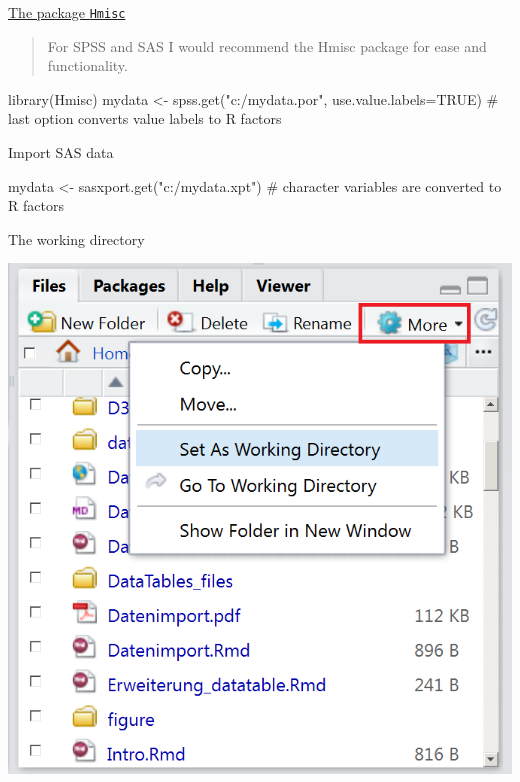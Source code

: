 \documentclass[
  10pt,
  ignorenonframetext,
]{beamer}
\newenvironment{Shaded}{\begin{snugshade}}{\end{snugshade}}
\newcommand{\CommentTok}[1]{\textcolor[rgb]{0.50,0.62,0.50}{#1}}
\newcommand{\DataTypeTok}[1]{\textcolor[rgb]{0.87,0.87,0.75}{#1}}
\newcommand{\KeywordTok}[1]{\textcolor[rgb]{0.94,0.87,0.69}{#1}}
\newcommand{\NormalTok}[1]{\textcolor[rgb]{0.80,0.80,0.80}{#1}}
\newcommand{\OtherTok}[1]{\textcolor[rgb]{0.94,0.94,0.56}{#1}}
\newcommand{\StringTok}[1]{\textcolor[rgb]{0.80,0.58,0.58}{#1}}
\begin{document}
\begin{frame}[fragile]{\href{https://www.statmethods.net/input/importingdata.html}{The
package \texttt{Hmisc}}}
\protect\hypertarget{the-package-hmisc}{}

\begin{quote}
For SPSS and SAS I would recommend the Hmisc package for ease and
functionality.
\end{quote}

\begin{Shaded}
\begin{Highlighting}[]
\KeywordTok{library}\NormalTok{(Hmisc)}
\NormalTok{mydata <-}\StringTok{ }\KeywordTok{spss.get}\NormalTok{(}\StringTok{"c:/mydata.por"}\NormalTok{, }\DataTypeTok{use.value.labels=}\OtherTok{TRUE}\NormalTok{)}
\CommentTok{# last option converts value labels to R factors}
\end{Highlighting}
\end{Shaded}

\begin{block}{Import SAS data}

\begin{Shaded}
\begin{Highlighting}[]
\NormalTok{mydata <-}\StringTok{ }\KeywordTok{sasxport.get}\NormalTok{(}\StringTok{"c:/mydata.xpt"}\NormalTok{)}
\CommentTok{# character variables are converted to R factors}
\end{Highlighting}
\end{Shaded}

\end{block}

\end{frame}

\begin{frame}{The working directory}
\protect\hypertarget{the-working-directory}{}

\includegraphics{figure/SetWD.PNG}

\end{frame}
\end{document}
